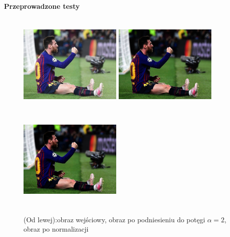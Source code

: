 \documentclass[magisterska,openany]{pracadypl}
\begin{document}
\newpage
\vspace{0.25cm}\textbf{\Large Przeprowadzone testy}
\vspace{0.5cm}
\begin{figure}[h]
\centering
\includegraphics[width=5cm, height=5cm]{orgi/RGBMessi.jpg}
\includegraphics[width=5cm, height=5cm]{4_6/powRGB1.jpg}
\includegraphics[width=5cm, height=5cm]{4_6/npowRGB1.jpg}
\caption{(Od lewej):obraz wejściowy, obraz po podniesieniu do potęgi $\alpha=2$,
obraz po normalizacji}
\end{figure}
\end{document}
